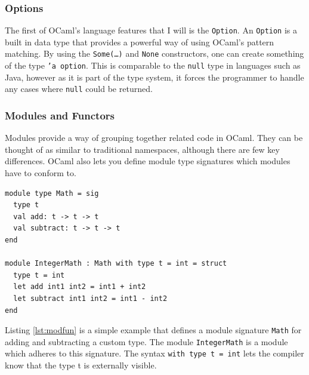 \documentclass[12pt,a4paper,twoside,openright]{report}
\begin{document}
	\subsubsection*{Options}
	The first of OCaml's language features that I will is the \texttt{Option}.
	An \texttt{Option} is a built in data type that provides a powerful way of using OCaml's pattern matching.
	By using the \texttt{Some(\ldots)} and \texttt{None} constructors, one can create something of the type \texttt{'a option}. 
	This is comparable to the \texttt{null} type in languages such as Java, however as it is part of the type system, it forces the programmer to handle any cases where \texttt{null} could be returned. 

	\subsubsection*{Modules and Functors}
	Modules provide a way of grouping together related code in OCaml.
	They can be thought of as similar to traditional namespaces, although there are few key differences.
	OCaml also lets you define module type signatures which modules have to conform to.\\
	\begin{lstlisting}[caption={OCaml Modules and Functors},label={lst:modfun}]
module type Math = sig
  type t
  val add: t -> t -> t
  val subtract: t -> t -> t
end

module IntegerMath : Math with type t = int = struct
  type t = int
  let add int1 int2 = int1 + int2
  let subtract int1 int2 = int1 - int2
end
	\end{lstlisting}
	\noindent Listing \ref{lst:modfun} is a simple example that defines a module signature \texttt{Math} for adding and subtracting a custom type.
	The module \texttt{IntegerMath} is a module which adheres to this signature. 
	The syntax \texttt{with type t = int} lets the compiler know that the type t is externally visible.\\
\end{document}
